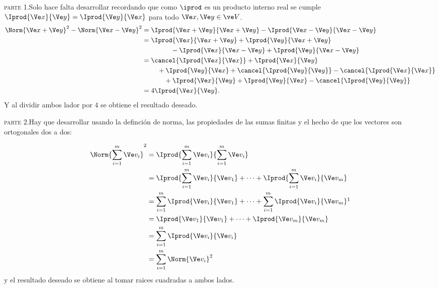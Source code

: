 	\begin{sol}
    \textsc{parte} 1.\quad Solo hace falta desarrollar recordando que como $\iprod$ es un producto interno real se cumple $\Iprod{\Ve x}{\Ve y}=\Iprod{\Ve y}{\Ve x}$ para todo $\Ve x,\Ve y\in\ve V$.
    \begin{align*}
    	\Norm{\Ve x+\Ve y}^2-\Norm{\Ve x-\Ve y}^2 &= \Iprod{\Ve x+\Ve y}{\Ve x+\Ve y} - \Iprod{\Ve x-\Ve y}{\Ve x-\Ve y} \\
    											  &= \Iprod{\Ve x}{\Ve x+\Ve y} + \Iprod{\Ve y}{\Ve x+\Ve y} \\
    											  &\phantom{=}\hspace{3.5em} - \Iprod{\Ve x}{\Ve x-\Ve y} + \Iprod{\Ve y}{\Ve x-\Ve y} \\
    											  &= \cancel{\Iprod{\Ve x}{\Ve x}} + \Iprod{\Ve x}{\Ve y} \\
    											   &\phantom{=}\hspace{1.5em} + \Iprod{\Ve y}{\Ve x} + \cancel{\Iprod{\Ve y}{\Ve y}} - \cancel{\Iprod{\Ve x}{\Ve x}} \\
    											  &\phantom{=}\hspace{2.5em} + \Iprod{\Ve x}{\Ve y} + \Iprod{\Ve y}{\Ve x} - \cancel{\Iprod{\Ve y}{\Ve y}} \\
    											  &=4\Iprod{\Ve x}{\Ve y}.
    \end{align*}
    Y al dividir ambos lador por $4$ se obtiene el resultado deseado.
    
    \textsc{parte} 2.\quad Hay que desarrollar usando la definción de norma, las propiedades de las sumas finitas y el hecho de que los vectores son ortogonales dos a dos:
    
    \allowdisplaybreaks
    \begin{align*}
    	\Norm{\sum_{i=1}^{m} \Ve v_i}^2 &= \Iprod{\sum_{i=1}^{m} \Ve v_i}{\sum_{i=1}^{m} \Ve v_i} \\
    									&= \Iprod{\sum_{i=1}^{m} \Ve v_i}{\Ve v_1} + \cdots + \Iprod{\sum_{i=1}^{m} \Ve v_i}{\Ve v_m} \\
    									&=\sum_{i=1}^{m} \Iprod{\Ve v_i}{\Ve v_1} + \cdots + \sum_{i=1}^{m} \Iprod{\Ve v_i}{\Ve v_m}\footnotemark \\
    									&= \Iprod{\Ve v_1}{\Ve v_1} + \cdots+\Iprod{\Ve v_m}{\Ve v_m} \\
    									&= \sum_{i=1}^{m} \Iprod{\Ve v_i}{\Ve v_i} \\
    									&= \sum_{i=1}^{m} \Norm{\Ve v_i}^2
    \end{align*}
    y el resultado deseado se obtiene al tomar raices cuadradas a ambos lados.
    

\end{sol}
